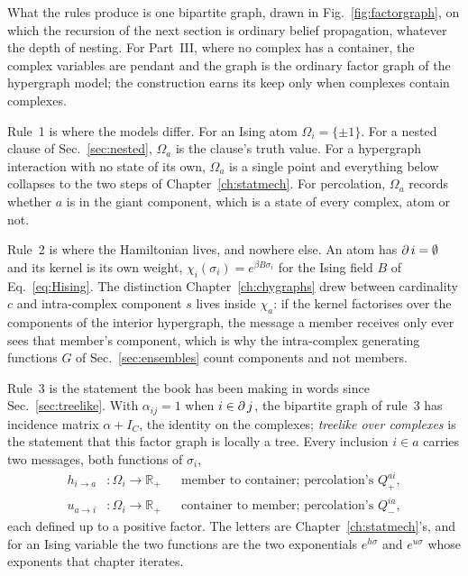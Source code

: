 What the rules produce is one bipartite graph, drawn in
Fig.~\ref{fig:factorgraph}, on which the recursion of the next section is
ordinary belief propagation, whatever the depth of nesting. For Part~III,
where no complex has a container, the complex variables are pendant and
the graph is the ordinary factor graph of the hypergraph model; the
construction earns its keep only when complexes contain complexes.


Rule~1 is where the models differ. For an Ising atom $\Omega_{i}=\{\pm1\}$.
For a nested clause of Sec.~\ref{sec:nested}, $\Omega_{a}$ is the clause's
truth value. For a hypergraph interaction with no state of its own,
$\Omega_{a}$ is a single point and everything below collapses to the two steps
of Chapter~\ref{ch:statmech}. For percolation, $\Omega_{a}$ records whether
$a$ is in the giant component, which is a state of every complex, atom or not.

Rule~2 is where the Hamiltonian lives, and nowhere else. An atom has
$\operatorname{\partial} i=\emptyset$ and its kernel is its own weight,
$\chi_{i}(\sigma_{i})=e^{\beta B\sigma_{i}}$ for the Ising field $B$ of
Eq.~\eqref{eq:Hising}. The distinction Chapter~\ref{ch:chygraphs} drew
between cardinality $c$ and intra-complex component $s$ lives inside
$\chi_{a}$: if the kernel factorises over the components of the interior
hypergraph, the message a member receives only ever sees that member's
component, which is why the intra-complex generating functions $G$ of
Sec.~\ref{sec:ensembles} count components and not members.

Rule~3 is the statement the book has been making in words since
Sec.~\ref{sec:treelike}. With $\alpha_{ij}=1$ when $i\in\operatorname{\partial} j$, the
bipartite graph of rule~3 has incidence matrix $\alpha+I_{C}$, the identity on
the complexes; \emph{treelike over complexes} is the statement that this
factor graph is locally a tree. Every inclusion $i\in a$ carries two messages,
both functions of $\sigma_{i}$,
\begin{align*}
  h_{i\to a}&\colon \Omega_{i}\to\mathbb{R}_{+}
  &&\text{member to container; percolation's } Q^{ai}_{+},\\
  u_{a\to i}&\colon \Omega_{i}\to\mathbb{R}_{+}
  &&\text{container to member; percolation's } Q^{ia}_{-},
\end{align*}
each defined up to a positive factor. The letters are
Chapter~\ref{ch:statmech}'s, and for an Ising variable the two functions are
the two exponentials $e^{h\sigma}$ and $e^{u\sigma}$ whose exponents that
chapter iterates.


